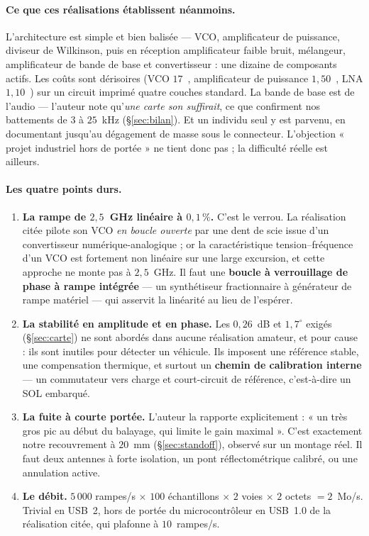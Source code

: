 \documentclass[11pt,a4paper]{article}
\begin{document}
\paragraph{Ce que ces réalisations établissent néanmoins.} L'architecture est
simple et bien balisée --- VCO, amplificateur de puissance, diviseur de
Wilkinson, puis en réception amplificateur faible bruit, mélangeur,
amplificateur de bande de base et convertisseur : une dizaine de composants
actifs. Les coûts sont dérisoires (VCO $17$~\texteuro, amplificateur de puissance
$1{,}50$~\texteuro, LNA $1{,}10$~\texteuro) sur un circuit imprimé quatre couches
standard. La bande de base est de l'audio --- l'auteur note qu'\emph{une carte
son suffirait}, ce que confirment nos battements de $3$ à $25$~kHz
(\S\ref{sec:bilan}). Et un individu seul y est parvenu, en documentant jusqu'au
dégagement de masse sous le connecteur. L'objection « projet industriel hors de
portée » ne tient donc pas ; la difficulté réelle est ailleurs.

\paragraph{Les quatre points durs.}

\begin{enumerate}
\item \textbf{La rampe de $2{,}5$~GHz linéaire à $0{,}1\,\%$.} C'est le
      verrou. La réalisation citée pilote son VCO \emph{en boucle ouverte} par
      une dent de scie issue d'un convertisseur numérique-analogique ; or la
      caractéristique tension--fréquence d'un VCO est fortement non linéaire
      sur une large excursion, et cette approche ne monte pas à $2{,}5$~GHz. Il
      faut une \textbf{boucle à verrouillage de phase à rampe intégrée} --- un
      synthétiseur fractionnaire à générateur de rampe matériel --- qui
      asservit la linéarité au lieu de l'espérer.
\item \textbf{La stabilité en amplitude et en phase.} Les $0{,}26$~dB et
      $1{,}7^\circ$ exigés (\S\ref{sec:carte}) ne sont abordés dans aucune
      réalisation amateur, et pour cause : ils sont inutiles pour détecter un
      véhicule. Ils imposent une référence stable, une compensation thermique,
      et surtout un \textbf{chemin de calibration interne} --- un commutateur
      vers charge et court-circuit de référence, c'est-à-dire un SOL embarqué.
\item \textbf{La fuite à courte portée.} L'auteur la rapporte explicitement :
      « un très gros pic au début du balayage, qui limite le gain maximal ».
      C'est exactement notre recouvrement à $20$~mm (\S\ref{sec:standoff}),
      observé sur un montage réel. Il faut deux antennes à forte isolation, un
      pont réflectométrique calibré, ou une annulation active.
\item \textbf{Le débit.} $5\,000$ rampes/s $\times$ $100$ échantillons
      $\times$ $2$ voies $\times$ $2$ octets $= 2$~Mo/s. Trivial en USB~2, hors
      de portée du microcontrôleur en USB~1.0 de la réalisation citée, qui
      plafonne à $10$~rampes/s.
\end{enumerate}
\end{document}
